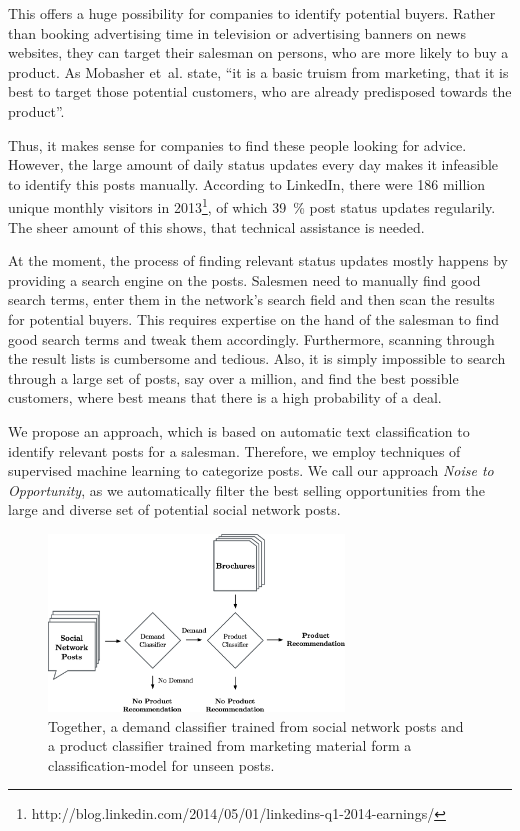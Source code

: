 This offers a huge possibility for companies to identify potential buyers.
Rather than booking advertising time in television or advertising banners on news websites, they can target their salesman on persons, who are more likely to buy a product.
As Mobasher et~al. \cite{mobasher2007toward} state, ``it is a basic truism from marketing, that it is best to target those potential customers, who are already predisposed towards the product''.

Thus, it makes sense for companies to find these people looking for advice.
However, the large amount of daily status updates every day makes it infeasible to identify this posts manually.
According to LinkedIn, there were 186 million unique monthly visitors in 2013\footnote{http://blog.linkedin.com/2014/05/01/linkedins-q1-2014-earnings/}, of which 39~\% post status updates regularily.
The sheer amount of this shows, that technical assistance is needed.

At the moment, the process of finding relevant status updates mostly happens by providing a search engine on the posts.
Salesmen need to manually find good search terms, enter them in the network's search field and then scan the results for potential buyers.
This requires expertise on the hand of the salesman to find good search terms and tweak them accordingly.
Furthermore, scanning through the result lists is cumbersome and tedious.
Also, it is simply impossible to search through a large set of posts, say over a million, and find the best possible customers, where best means that there is a high probability of a deal.

We propose an approach, which is based on automatic text classification to identify relevant posts for a salesman.
Therefore, we employ techniques of supervised machine learning to categorize posts.
We call our approach \emph{Noise to Opportunity}, as we automatically filter the best selling opportunities from the large and diverse set of potential social network posts.
\begin{figure}
	\label{fig:figureone}
	\begin{center}
		\includegraphics[width=0.7\textwidth]{figures/nto_workflow.eps}
	\end{center}
	\caption{Together, a demand classifier trained from social network posts and a product classifier trained from marketing material form a classification-model for unseen posts.}
\end{figure}

